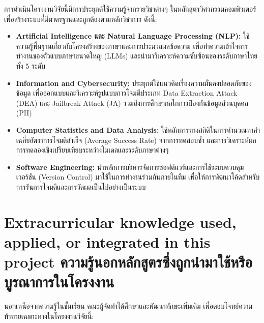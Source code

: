 การดำเนินโครงงานวิจัยนี้มีการประยุกต์ใช้ความรู้จากรายวิชาต่างๆ ในหลักสูตรวิศวกรรมคอมพิวเตอร์
เพื่อสร้างระบบที่มีมาตรฐานและถูกต้องตามหลักวิชาการ ดังนี้:

\begin{itemize}
  \item \textbf{Artificial Intelligence และ Natural Language Processing (NLP):}
    ใช้ความรู้พื้นฐานเกี่ยวกับโครงสร้างของภาษาและการประมวลผลข้อความ
    เพื่อทำความเข้าใจการทำงานของตัวแบบภาษาขนาดใหญ่ (LLMs)
    และนำมาวิเคราะห์ความซับซ้อนของระดับภาษาไทยทั้ง 5 ระดับ
  \item \textbf{Information and Cybersecurity:}
    ประยุกต์ใช้แนวคิดเรื่องความมั่นคงปลอดภัยของข้อมูล
    เพื่อออกแบบและวิเคราะห์รูปแบบการโจมตีประเภท Data Extraction Attack (DEA)
    และ Jailbreak Attack (JA) รวมถึงการศึกษากลไกการป้องกันข้อมูลส่วนบุคคล (PII)
  \item \textbf{Computer Statistics and Data Analysis:}
    ใช้หลักการทางสถิติในการคำนวณหาค่าเฉลี่ยอัตราการโจมตีสำเร็จ (Average Success Rate)
    จากการทดสอบซ้ำ และการวิเคราะห์ผลการทดลองเชิงเปรียบเทียบระหว่างโมเดลและระดับภาษาต่างๆ
  \item \textbf{Software Engineering:}
    นำหลักการบริหารจัดการซอฟต์แวร์และการใช้ระบบควบคุมเวอร์ชัน (Version Control)
    มาใช้ในการทำงานร่วมกันภายในทีม
    เพื่อให้การพัฒนาโค้ดสำหรับการรันการโจมตีและการวัดผลเป็นไปอย่างเป็นระบบ
\end{itemize}

\section{\ifenglish%
  Extracurricular knowledge used, applied, or integrated in this project
\else%
  ความรู้นอกหลักสูตรซึ่งถูกนำมาใช้หรือบูรณาการในโครงงาน
\fi}

นอกเหนือจากความรู้ในชั้นเรียน คณะผู้จัดทำได้ศึกษาและพัฒนาทักษะเพิ่มเติม
เพื่อตอบโจทย์ความท้าทายเฉพาะทางในโครงงานวิจัยนี้:

